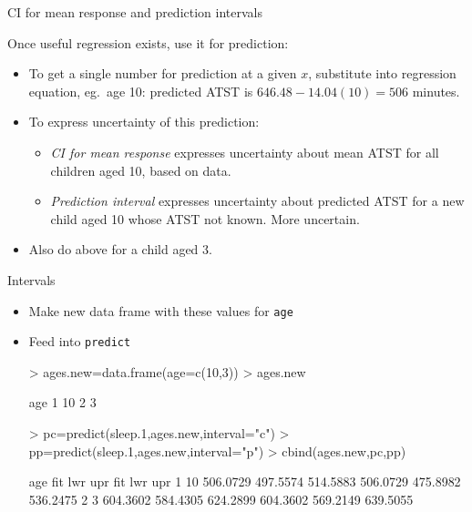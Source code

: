 \documentclass{beamer}
\begin{document}
\begin{frame}{CI for mean response and prediction intervals}

Once useful regression exists, use it for prediction:


\begin{itemize}
\item To get a single number for prediction at a given $x$, substitute into regression equation, eg.\ age 10: predicted ATST is $646.48-14.04(10)=506$ minutes.
\item To express uncertainty of this prediction:
  \begin{itemize}
  \item {\em CI for mean response} expresses uncertainty about mean ATST for all children aged 10, based on data.
  \item {\em Prediction interval} expresses uncertainty about predicted ATST for a new child aged 10 whose ATST not known. More uncertain.
  \end{itemize}
\item Also do above for a child aged 3.
\end{itemize}
\end{frame}
\begin{frame}[fragile]{Intervals}
\begin{itemize}
\item Make new data frame with these values for \texttt{age}
\item Feed into \texttt{predict}

\begin{Schunk}
\begin{Sinput}
> ages.new=data.frame(age=c(10,3))
> ages.new
\end{Sinput}
\begin{Soutput}
  age
1  10
2   3
\end{Soutput}
\end{Schunk}

{\small
\begin{Schunk}
\begin{Sinput}
> pc=predict(sleep.1,ages.new,interval="c")
> pp=predict(sleep.1,ages.new,interval="p")
> cbind(ages.new,pc,pp)
\end{Sinput}
\begin{Soutput}
  age      fit      lwr      upr      fit      lwr      upr
1  10 506.0729 497.5574 514.5883 506.0729 475.8982 536.2475
2   3 604.3602 584.4305 624.2899 604.3602 569.2149 639.5055
\end{Soutput}
\end{Schunk}
}


\end{itemize}

\end{frame}
\end{document}
